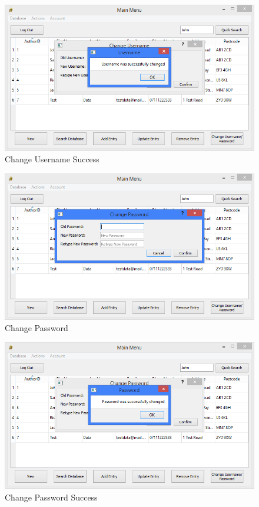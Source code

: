 \begin{figure}[H]
    \caption{Change Username Success} \label{fig:ChangeUsernameSuccess}
    \includegraphics[width=\textwidth]{./Maintenance/UserInterface/ChangeUsernameSuccess.png}
\end{figure}

\begin{figure}[H]
    \caption{Change Password} \label{fig:ChangePassword}
    \includegraphics[width=\textwidth]{./Maintenance/UserInterface/ChangePassword.png}
\end{figure}

\begin{figure}[H]
    \caption{Change Password Success} \label{fig:ChangePasswordSuccess}
    \includegraphics[width=\textwidth]{./Maintenance/UserInterface/ChangePasswordSuccess.png}
\end{figure}

